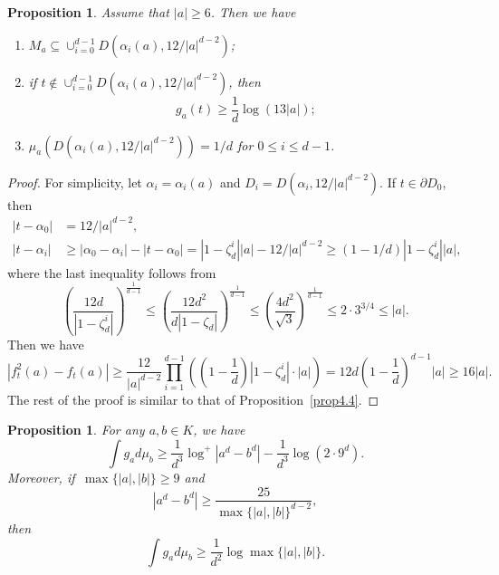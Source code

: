\documentclass[10pt,a4paper]{amsart}
\numberwithin{equation}{section}
\theoremstyle{plain}
\newtheorem{prop}[thm]{Proposition}
\theoremstyle{definition}
\theoremstyle{remark}
\begin{document}
\begin{prop}\label{prop4.7}
  Assume that $|a|\geq6$. Then we have
\begin{enumerate}
\item $M_{a}\subseteq\cup_{i=0}^{d-1}D(\alpha_{i}(a),12/|a|^{d-2})$; 
\item if $t\notin\cup_{i=0}^{d-1}D(\alpha_{i}(a),12/|a|^{d-2})$, then
\[
g_{a}(t)\geq\frac{1}{d}\log(13|a|); 
\]
\item $\mu_{a}(D(\alpha_{i}(a),12/|a|^{d-2}))=1/d$ for $0\leq i\leq d-1$.
\end{enumerate}
\end{prop}

\begin{proof}
For simplicity, let $\alpha_{i}=\alpha_{i}(a)$ and $D_{i}=D(\alpha_{i},12/|a|^{d-2})$.
If $t\in\partial D_{0}$, then
\begin{align*}
|t-\alpha_{0}| & =12/|a|^{d-2},\\
|t-\alpha_{i}| & \geq|\alpha_{0}-\alpha_{i}|-|t-\alpha_{0}|=\left|1-\zeta_{d}^{i}\right||a|-12/|a|^{d-2}\geq(1-1/d)\left|1-\zeta_{d}^{i}\right||a|,
\end{align*}
where the last inequality follows from
\[
\left(\frac{12d}{\left|1-\zeta_{d}^{i}\right|}\right)^{\frac{1}{d-1}}\leq\left(\frac{12d^{2}}{d\left|1-\zeta_{d}\right|}\right)^{\frac{1}{d-1}}\leq\left(\frac{4d^{2}}{\sqrt{3}}\right)^{\frac{1}{d-1}}\leq2\cdot3^{3/4}\leq|a|.
\]
Then we have
\[
|f_{t}^{2}(a)-f_{t}(a)|\geq\frac{12}{|a|^{d-2}}\prod_{i=1}^{d-1}\left(\left(1-\frac{1}{d}\right)|1-\zeta_{d}^{i}|\cdot|a|\right)=12d\left(1-\frac{1}{d}\right)^{d-1}|a|\geq16|a|.
\]
The rest of the proof is similar to that of Proposition~\ref{prop4.4}.
\end{proof}

\begin{prop}\label{prop4.8}
For any $a,b\in K$, we have
\[
\int g_{a}d\mu_{b}\geq\frac{1}{d^{3}}\log^{+}\left|a^{d}-b^{d}\right|-\frac{1}{d^{3}}\log\left(2\cdot9^{d}\right).
\]
Moreover, if\, $\max\{|a|,|b|\}\geq9$ and
\begin{equation}
\left|a^{d}-b^{d}\right|\geq\frac{25}{\max\{|a|,|b|\}^{d-2}},\label{eq4.2}
\end{equation}
then
\[
\int g_{a}d\mu_{b}\geq\frac{1}{d^{2}}\log\max\{|a|,|b|\}.
\]
\end{prop}
\end{document}
